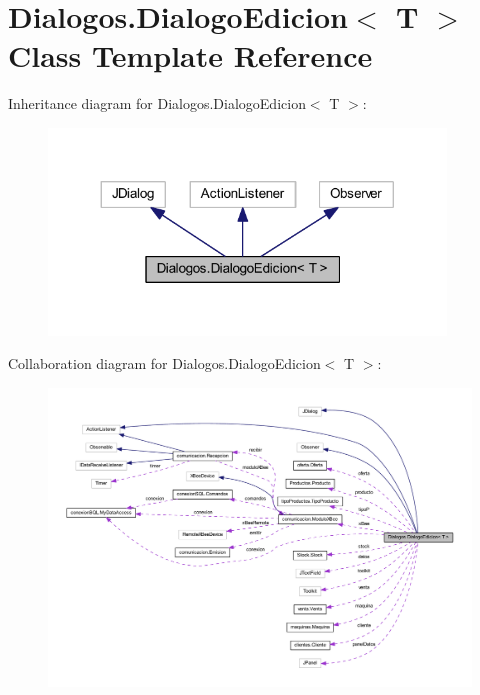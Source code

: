 \hypertarget{class_dialogos_1_1_dialogo_edicion}{}\section{Dialogos.\+Dialogo\+Edicion$<$ T $>$ Class Template Reference}
\label{class_dialogos_1_1_dialogo_edicion}


Inheritance diagram for Dialogos.\+Dialogo\+Edicion$<$ T $>$\+:
\nopagebreak
\begin{figure}[H]
\begin{center}
\leavevmode
\includegraphics[width=299pt]{class_dialogos_1_1_dialogo_edicion__inherit__graph}
\end{center}
\end{figure}


Collaboration diagram for Dialogos.\+Dialogo\+Edicion$<$ T $>$\+:
\nopagebreak
\begin{figure}[H]
\begin{center}
\leavevmode
\includegraphics[width=350pt]{class_dialogos_1_1_dialogo_edicion__coll__graph}
\end{center}
\end{figure}
